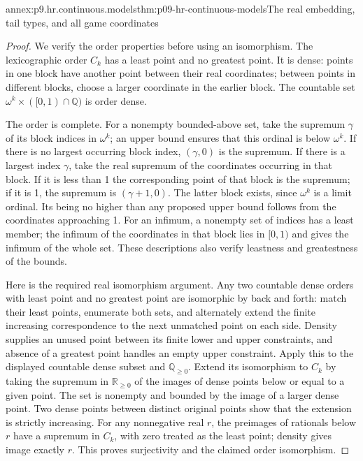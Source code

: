 \begin{annexitem}{annex:p9.hr.continuous.models}{thm:p09-hr-continuous-models}{The real embedding, tail types, and all game coordinates}
\begin{proof}
We verify the order properties
before using an isomorphism.
The lexicographic order \(C_k\)
has a least point and no greatest
point. It is dense: points in
one block have another point
between their real coordinates;
between points in different
blocks, choose a larger coordinate
in the earlier block.
The countable set
\(\omega^k\times([0,1)\cap\mathbb Q)\)
is order dense.

The order is complete. For a
nonempty bounded-above set,
take the supremum \(\gamma\)
of its block indices in
\(\omega^k\); an upper bound
ensures that this ordinal
is below \(\omega^k\).
If there is no largest
occurring block index,
\((\gamma,0)\) is the
supremum. If there is a
largest index \(\gamma\),
take the real supremum
of the coordinates occurring
in that block. If it is
less than 1 the corresponding
point of that block is
the supremum; if it is
1, the supremum is
\((\gamma+1,0)\).
The latter block exists,
since \(\omega^k\) is a
limit ordinal. Its being
no higher than any proposed
upper bound follows from
the coordinates approaching
1. For an infimum, a
nonempty set of indices
has a least member; the
infimum of the coordinates
in that block lies in
\([0,1)\) and gives the
infimum of the whole set.
These descriptions also
verify leastness and
greatestness of the bounds.

Here is the required real
isomorphism argument.
Any two countable dense
orders with least point
and no greatest point
are isomorphic by back
and forth: match their
least points, enumerate
both sets, and alternately
extend the finite increasing
correspondence to the next
unmatched point on each
side. Density supplies an
unused point between its
finite lower and upper
constraints, and absence
of a greatest point handles
an empty upper constraint.
Apply this to the displayed
countable dense subset
and \(\mathbb Q_{\geq0}\).
Extend its isomorphism
to \(C_k\) by taking
the supremum in
\(\mathbb R_{\geq0}\)
of the images of dense
points below or equal
to a given point.
The set is nonempty
and bounded by the
image of a larger
dense point. Two
dense points between
distinct original
points show that
the extension is
strictly increasing.
For any nonnegative
real \(r\), the
preimages of rationals
below \(r\) have a
supremum in \(C_k\),
with zero treated as
the least point;
density gives image
exactly \(r\).
This proves surjectivity
and the claimed
order isomorphism.


\end{proof}
\end{annexitem}
